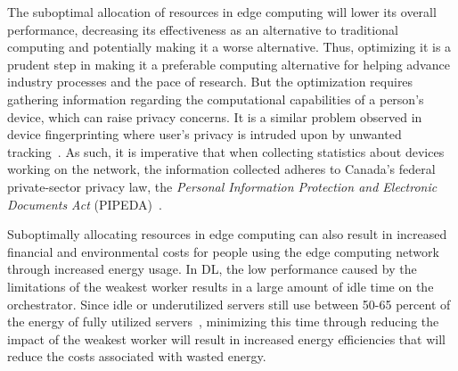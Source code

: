 \documentclass[../mthe-493-final-project.tex]{subfiles}
\begin{document}
    The suboptimal allocation of resources in edge computing will lower its overall performance, decreasing its effectiveness as an alternative to traditional computing and potentially making it a worse alternative. Thus, optimizing it is a prudent step in making it a preferable computing alternative for helping advance industry processes and the pace of research. But the optimization requires gathering information regarding the computational capabilities of a person's device, which can raise privacy concerns. It is a similar problem observed in device fingerprinting where user's privacy is intruded upon by unwanted tracking~\cite{laperdrix_browser_2020}. As such, it is imperative that when collecting statistics about devices working on the network, the information collected adheres to Canada’s federal private-sector privacy law, the \textit{Personal Information Protection and Electronic Documents Act} (PIPEDA)~\cite{noauthor_privacy_nodate}.

    Suboptimally allocating resources in edge computing can also result in increased financial and environmental costs for people using the edge computing network through increased energy usage. In DL, the low performance caused by the limitations of the weakest worker results in a large amount of idle time on the orchestrator. Since idle or underutilized servers still use between 50-65 percent of the energy of fully utilized servers~\cite{noauthor_triple_nodate}, minimizing this time through reducing the impact of the weakest worker will result in increased energy efficiencies that will reduce the costs associated with wasted energy.
\end{document}
